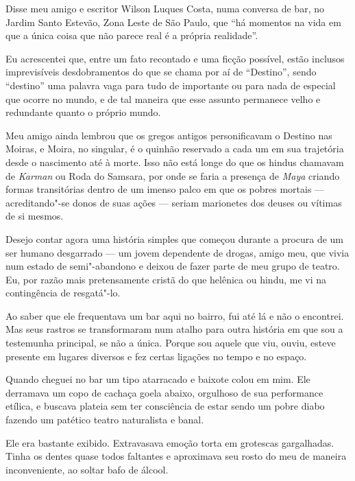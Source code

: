 

Disse meu amigo e escritor Wilson Luques Costa, numa conversa de bar, no
Jardim Santo Estevão, Zona Leste de São Paulo, que ``há momentos na vida
em que a única coisa que não parece real é a própria realidade''.

Eu acrescentei que, entre um fato recontado e uma ficção possível, estão
inclusos imprevisíveis desdobramentos do que se chama por aí de
``Destino'', sendo ``destino'' uma palavra vaga para tudo de importante
ou para nada de especial que ocorre no mundo, e de tal maneira que esse
assunto permanece velho e redundante quanto o próprio mundo.

Meu amigo ainda lembrou que os gregos antigos personificavam o Destino
nas Moiras, e Moira, no singular, é o quinhão reservado a cada um em sua
trajetória desde o nascimento até à morte. Isso não está longe do que os
hindus chamavam de \emph{Karman} ou Roda do Samsara, por onde se faria a
presença de \emph{Maya} criando formas transitórias dentro de um imenso
palco em que os pobres mortais --- acreditando"-se donos de suas ações
--- seriam marionetes dos deuses ou vítimas de si mesmos.

\asterisc{}

Desejo contar agora uma história simples que começou durante a procura de
um ser humano desgarrado --- um jovem dependente de drogas, amigo meu,
que vivia num estado de semi"-abandono e deixou de fazer parte de meu
grupo de teatro. Eu, por razão mais pretensamente cristã do que helênica
ou hindu, me vi na contingência de resgatá"-lo.

Ao saber que ele frequentava um bar aqui no bairro, fui até lá e não o
encontrei. Mas seus rastros se transformaram num atalho para outra
história em que sou a testemunha principal, se não a única. Porque sou
aquele que viu, ouviu, esteve presente em lugares diversos e fez certas
ligações no tempo e no espaço.

\asterisc{}

Quando cheguei no bar um tipo atarracado e baixote colou em mim. Ele
derramava um copo de cachaça goela abaixo, orgulhoso de sua performance
etílica, e buscava plateia sem ter consciência de estar sendo um pobre
diabo fazendo um patético teatro naturalista e banal.

Ele era bastante exibido. Extravasava emoção torta em grotescas
gargalhadas. Tinha os dentes quase todos faltantes e aproximava seu
rosto do meu de maneira inconveniente, ao soltar bafo de álcool.

